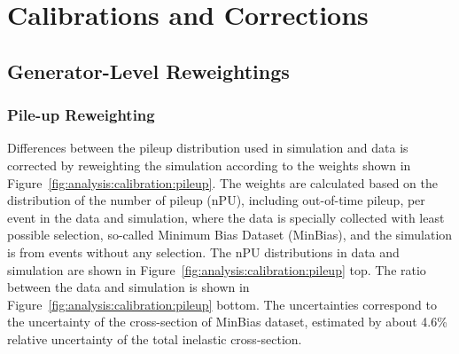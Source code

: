 
\section{Calibrations and Corrections}
\label{sec:analysis:calibration}



\subsection{Generator-Level Reweightings}
\label{sec:analysis:calibration:genlevel}


\subsubsection{Pile-up Reweighting}
Differences between the pileup distribution used in simulation and data is corrected by reweighting the simulation according to the weights shown in Figure~\ref{fig:analysis:calibration:pileup}. The weights are calculated based on the distribution of the number of pileup (nPU), including out-of-time pileup, per event in the data and simulation, where the data is specially collected with least possible selection, so-called Minimum Bias Dataset (MinBias), and the simulation is from \zjets events without any selection. The nPU distributions in data and simulation are shown in Figure~\ref{fig:analysis:calibration:pileup} top. The ratio between the data and simulation is shown in Figure~\ref{fig:analysis:calibration:pileup} bottom. The uncertainties correspond to the uncertainty of the cross-section of MinBias dataset, estimated by about 4.6\% relative uncertainty of the total inelastic cross-section.

